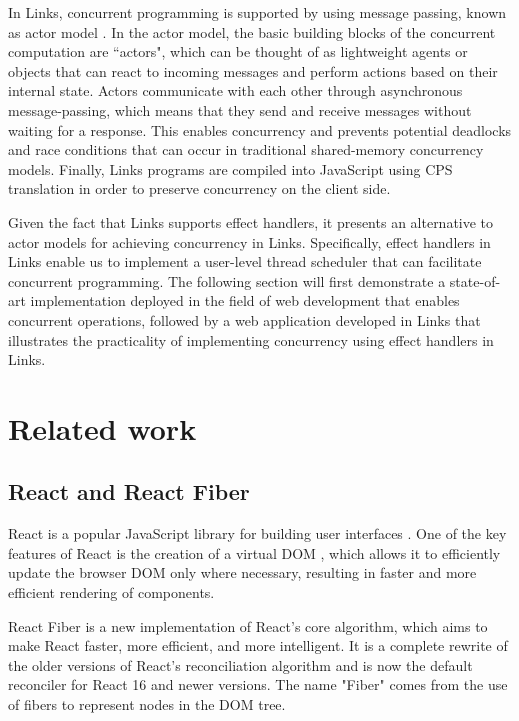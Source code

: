 \documentclass[logo,bsc,singlespacing,parskip]{infthesis}
\begin{document}
In Links, concurrent programming is supported by using message passing, known as actor model \cite{hewitt2015actor}. In the actor model, the basic building blocks of the concurrent computation are ``actors", which can be thought of as lightweight agents or objects that can react to incoming messages and perform actions based on their internal state. Actors communicate with each other through asynchronous message-passing, which means that they send and receive messages without waiting for a response. This enables concurrency and prevents potential deadlocks and race conditions that can occur in traditional shared-memory concurrency models. Finally, Links programs are compiled into JavaScript using CPS translation \cite{hillerstrm_et_al:LIPIcs:2017:7739} in order to preserve concurrency on the client side.

Given the fact that Links supports effect handlers, it presents an alternative to actor models for achieving concurrency in Links. Specifically, effect handlers in Links enable us to implement a user-level thread scheduler that can facilitate concurrent programming. The following section will first demonstrate a state-of-art implementation deployed in the field of web development that enables concurrent operations, followed by a web application developed in Links that illustrates the practicality of implementing concurrency using effect handlers in Links.

\section{Related work}

\subsection{React and React Fiber}
React is a popular JavaScript library for building user interfaces \cite{react}. One of the key features of React is the creation of a virtual DOM \cite{virtualdom}, which allows it to efficiently update the browser DOM only where necessary, resulting in faster and more efficient rendering of components.

React Fiber \cite{fiber} is a new implementation of React's core algorithm, which aims to make React faster, more efficient, and more intelligent. It is a complete rewrite of the older versions of React's reconciliation algorithm and is now the default reconciler for React 16 and newer versions. The name "Fiber" comes from the use of fibers to represent nodes in the DOM tree.
\end{document}
